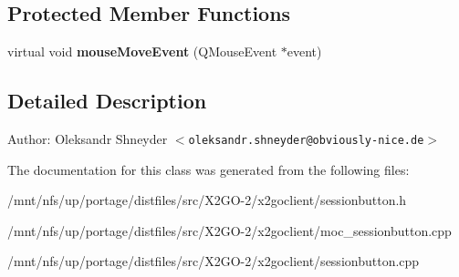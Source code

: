 \subsection*{Protected Member Functions}
\begin{CompactItemize}
\item 
virtual void \textbf{mouse\-Move\-Event} (QMouse\-Event $\ast$event)\label{classSessionButton_bfb27518381e81c2444fc515379580a0}

\end{CompactItemize}


\subsection{Detailed Description}
\begin{Desc}
\item[Author:]Oleksandr Shneyder $<$\tt{oleksandr.shneyder@obviously-nice.de}$>$ \end{Desc}




The documentation for this class was generated from the following files:\begin{CompactItemize}
\item 
/mnt/nfs/up/portage/distfiles/src/X2GO-2/x2goclient/sessionbutton.h\item 
/mnt/nfs/up/portage/distfiles/src/X2GO-2/x2goclient/moc\_\-sessionbutton.cpp\item 
/mnt/nfs/up/portage/distfiles/src/X2GO-2/x2goclient/sessionbutton.cpp\end{CompactItemize}
